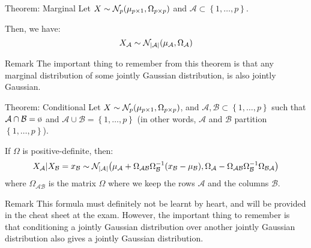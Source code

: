 \documentclass[a4paper]{article}
\begin{document}
\begin{parag}{Theorem: Marginal}
    Let $X \followsdistr \mathcal{N}_p\left(\mu_{p\times 1}, \Omega_{p \times p}\right)$ and  $\mathcal{A} \subset \left\{1, \ldots, p\right\}$. 

    Then, we have:
    \[X_{\mathcal{A}} \followsdistr \mathcal{N}_{\left|\mathcal{A}\right|} \left(\mu_{\mathcal{A}}, \Omega_{\mathcal{A}}\right)\]
    
    \begin{subparag}{Remark}
        The important thing to remember from this theorem is that any marginal distribution of some jointly Gaussian distribution, is also jointly Gaussian.
    \end{subparag}
\end{parag}

\begin{parag}{Theorem: Conditional}
    Let $X \followsdistr \mathcal{N}_p\left(\mu_{p\times 1}, \Omega_{p \times p}\right)$, and $\mathcal{A}, \mathcal{B} \subset \left\{1, \ldots, p\right\}$ such that $\mathcal{A} \cap \mathcal{B} = \o$ and $\mathcal{A} \cup \mathcal{B} = \left\{1, \ldots, p\right\}$ (in other words, $\mathcal{A}$ and $\mathcal{B}$ partition $\left\{1, \ldots, p\right\}$).

    If $\Omega$ is positive-definite, then:
    \[X_{\mathcal{A}}|X_{\mathcal{B}} = x_{\mathcal{B}}\followsdistr \mathcal{N}_{\left|\mathcal{A}\right|} \left(\mu_{\mathcal{A}} + \Omega_{\mathcal{AB}} \Omega^{-1}_{\mathcal{B}} \left(x_{\mathcal{B}} - \mu_{\mathcal{B}}\right), \Omega_{\mathcal{A}} - \Omega_{\mathcal{A}\mathcal{B}}\Omega_{\mathcal{B}}^{-1} \Omega_{\mathcal{B}\mathcal{A}}\right)\]
    where $\Omega_{\mathcal{A}\mathcal{B}}$ is the matrix $\Omega$ where we keep the rows $\mathcal{A}$ and the columns $\mathcal{B}$.

    \begin{subparag}{Remark}
        This formula must definitely not be learnt by heart, and will be provided in the cheat sheet at the exam. However, the important thing to remember is that conditioning a jointly Gaussian distribution over another jointly Gaussian distribution also gives a jointly Gaussian distribution.
    \end{subparag}
\end{parag}
\end{document}
